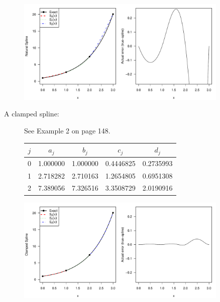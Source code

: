\documentclass[12pt]{article}
\begin{document}
\begin{description}
\begin{description}
\begin{center}
\includegraphics[width=0.9\textwidth]{natural.pdf}
\end{center}

\vfill

\item[A clamped spline:] See Example 2 on page 148.
\begin{center}
\begin{tabular}{c|cccc}
\(j\) & \(a_j\) & \(b_j\) & \(c_j\) & \(d_j\)\\
\hline
\hline
0 & 1.000000 & 1.000000 & 0.4446825 & 0.2735993\\
1 & 2.718282 & 2.710163 & 1.2654805 & 0.6951308\\
2 & 7.389056 & 7.326516 & 3.3508729 & 2.0190916
\end{tabular}

\includegraphics[width=0.9\textwidth]{clamped.pdf}

\end{center}
\end{description}
\end{description}
\end{document}
